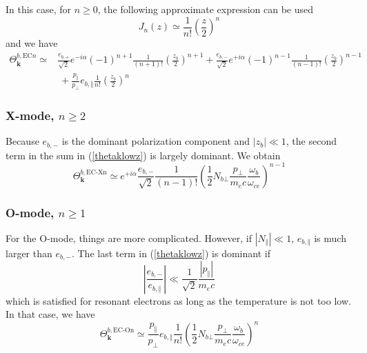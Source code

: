 In this case, for $n\geq0$, the following approximate expression can be used
\begin{equation}
J_{n}\left(  z\right)  \simeq\frac{1}{n!}\left(  \frac{z}{2}\right)  ^{n}%
\end{equation}
and we have
\begin{align}
\Theta_{\mathbf{k}}^{b,\text{EC}n}\simeq&\frac{e_{b,+}}{\sqrt{2}}e^{-i\alpha
}\left(  -1\right)  ^{n+1}\frac{1}{\left(  n+1\right)  !}\left(  \frac{z_{b}%
}{2}\right)  ^{n+1}+\frac{e_{b,-}}{\sqrt{2}}e^{+i\alpha}\left(  -1\right)
^{n-1}\frac{1}{\left(  n-1\right)  !}\left(  \frac{z_{b}}{2}\right)
^{n-1}\nonumber\\&\ +\frac{p_{\Vert}}{p_{\bot}}e_{b,\Vert}\frac{1}{n!}\left(  \frac{z_{b}%
}{2}\right)  ^{n} \label{thetaklowz}%
\end{align}

\subsubsection{X-mode, $n\geq2$}

Because $e_{b,-}$ is the dominant polarization component and $\left|
z_{b}\right|  \ll1$, the second term in the sum in (\ref{thetaklowz}) is
largely dominant. We obtain%
\begin{equation}
\Theta_{\mathbf{k}}^{b,\text{EC-Xn}}\simeq e^{+i\alpha}\frac{e_{b,-}}{\sqrt
{2}}\frac{1}{\left(  n-1\right)  !}\left(  \frac{1}{2}N_{b\bot}\frac{p_{\bot}%
}{m_{e}c}\frac{\omega_{b}}{\omega_{ce}}\right)  ^{n-1} \label{thetakX}%
\end{equation}

\subsubsection{O-mode, $n\geq1$}

\bigskip For the O-mode, things are more complicated. However, if $\left|
N_{\Vert}\right|  \ll1$, $e_{b,\Vert}$ is much larger than $e_{b,-}$. The last
term in (\ref{thetaklowz}) is dominant if%
\begin{equation}
\left|  \frac{e_{b,-}}{e_{b,\Vert}}\right|  \ll\frac{1}{\sqrt{2}}\frac{\left|
p_{\Vert}\right|  }{m_{e}c}%
\end{equation}
which is satisfied for resonant electrons as long as the temperature is not
too low. In that case, we have%
\begin{equation}
\Theta_{\mathbf{k}}^{b,\text{EC-On}}\simeq\frac{p_{\Vert}}{p_{\bot}}%
e_{b,\Vert}\frac{1}{n!}\left(  \frac{1}{2}N_{b\bot}\frac{p_{\bot}}{m_{e}%
c}\frac{\omega_{b}}{\omega_{ce}}\right)  ^{n} \label{thetakO}%
\end{equation}


